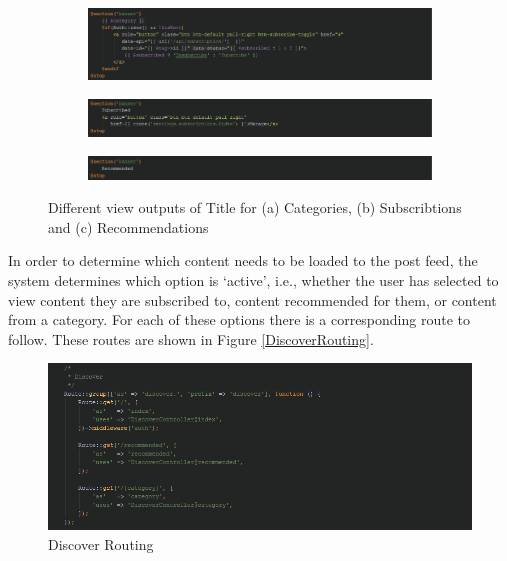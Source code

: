 \begin{figure}[H]
\centering
\begin{subfigure}[b]{1\linewidth}
	\includegraphics[width=\textwidth]{Images/Implementation/CategoryBladePhp}
	\caption{}
	\label{fig:CategoryBladePhp}
\end{subfigure}
\begin{subfigure}[b]{1\linewidth}
	\includegraphics[width=\textwidth]{Images/Implementation/IndexBladePhp}
	\caption{}
	\label{fig:IndexBladePhp}
\end{subfigure}
\begin{subfigure}[b]{1\linewidth}
	\includegraphics[width=\textwidth]{Images/Implementation/RecommendedBladePhp}
	\caption{}
	\label{fig:RecommendedBladePhp}
\end{subfigure}
\caption{Different view outputs of Title for (a) Categories, (b) Subscribtions and (c) Recommendations}
\label{fig:DiscoverTitle}
\end{figure}

In order to determine which content needs to be loaded to the post feed, the system determines which option is `active', i.e., whether the user has selected to view content they are subscribed to, content recommended for them, or content from a category. For each of these options there is a corresponding route to follow. These routes are shown in Figure \ref{DiscoverRouting}.

\begin{figure}[H]
\centering
\includegraphics[width=\textwidth]{Images/Implementation/DiscoverRouting}
\caption{Discover Routing}
\label{fig:DiscoverRouting}
\end{figure}

